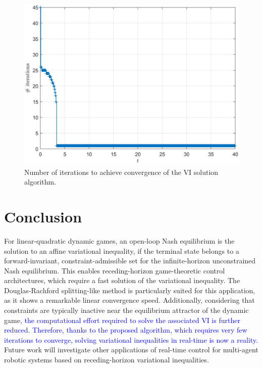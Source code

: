 \documentclass[letterpaper, 10 pt, conference]{ieeeconf}  %
\newcommand{\edit}[1]{\textcolor{blue}{#1}}
\begin{document}
{\begin{figure}
    \centering
    \includegraphics[width=.75\linewidth]{Simulations/num_iter_to_convergence.png}
    \caption{{Number of iterations to achieve convergence of the VI solution algorithm.}} %
    \label{fig:simulation_result_convergence}
\end{figure}

\section{Conclusion}\label{sec: conclusion}
For linear-quadratic dynamic games, an open-loop Nash equilibrium is the solution to an affine variational inequality, if the terminal state belongs to a forward-invariant, constraint-admissible set for the infinite-horizon unconstrained Nash equilibrium. This enables receding-horizon game-theoretic control architectures, which require a fast solution of the variational inequality. The Douglas-Rachford splitting-like method is particularly suited for this application, as it shows a remarkable linear convergence speed. Additionally, considering that constraints are typically inactive near the equilibrium attractor of the dynamic game, \edit{the computational effort required to solve the associated VI is further reduced. Therefore, thanks to the proposed algorithm, which requires very few iterations to converge, solving variational inequalities in real-time is now a reality.} Future work will investigate other applications of real-time control for multi-agent robotic systems based on receding-horizon variational inequalities.


}
\end{document}
